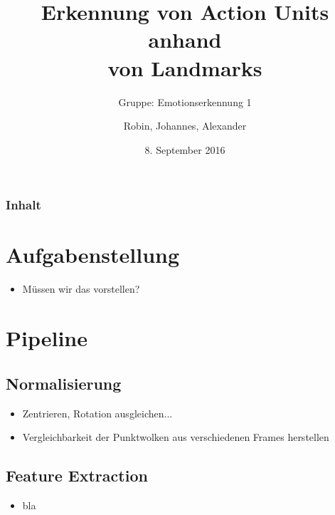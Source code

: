 \documentclass{beamer}
\author{Robin, Johannes, Alexander}
\title{Erkennung von Action Units anhand \\ von Landmarks}
\subtitle{Gruppe: Emotionserkennung 1}
\date{8. September 2016}
\begin{document}
%



\begin{frame}[plain]
  \maketitle
\end{frame}
\begin{frame}
  \frametitle{Inhalt}
  \tableofcontents
\end{frame}

\section{Aufgabenstellung}
\begin{frame}
  \begin{itemize}
    \item Müssen wir das vorstellen?
  \end{itemize}
\end{frame}

\section{Pipeline}
\subsection{Normalisierung}
\begin{frame}
  \begin{itemize}
    \item Zentrieren, Rotation ausgleichen...
    \item Vergleichbarkeit der Punktwolken aus verschiedenen Frames herstellen
  \end{itemize}
\end{frame}

\subsection{Feature Extraction}
\begin{frame}
  \begin{itemize}
    \item bla
  \end{itemize}
\end{frame}
\end{document}
